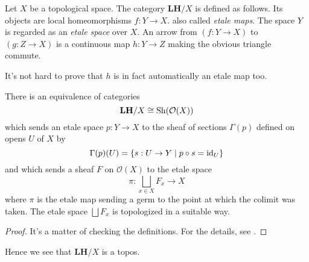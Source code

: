 \begin{definition}
\label{def:LH/X}
Let $X$ be a topological space. The category $\mathbf{LH}/X$ is defined as follows. Its objects are local homeomorphisms  $f : Y \to X$. also called \emph{etale maps}.  The space $Y$ is regarded as an \emph{etale space}  over $X$. An arrow from $(f : Y \to X)$ to $(g : Z \to X)$ is a continuous map $h : Y \to Z$ making the obvious triangle commute.
\end{definition}

It's not hard to prove that $h$ is in fact automatically an etale map too. 

\begin{theorem}
\label{thm:equivalence of categories between etale spaces and sheaves}
There is an equivalence of categories
\[ \mathbf{LH}/X \cong \operatorname{Sh}(\mathcal{O}(X)) \]
which sends an etale space $p : Y \to X$ to the sheaf of sections $\Gamma(p)$ defined on opens $U$ of $X$ by
\[ \Gamma(p)(U) = \left\{ s : U \to Y \mid p \circ s = \operatorname{id}_U \right\} \]
and which sends a sheaf $F$ on $\mathcal{O}(X)$ to the etale space
\[ \pi : \bigsqcup_{x \in X} F_x \to X \]
where $\pi$ is the etale map sending a germ to the point at which the colimit was taken. The etale space $\bigsqcup F_x$ is topologized in a suitable way.
\end{theorem}
\begin{proof}
It's a matter of checking the definitions. For the details, see \cite[Corollary II.6.3]{MacLaneMoerdijk91}.
\end{proof}
Hence we see that $\mathbf{LH}/X$ is a topos.